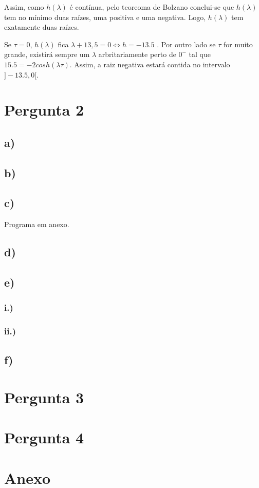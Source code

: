 \documentclass[a4paper, 12pt]{article}
\begin{document}
	\par
	Assim, como $h(\lambda)$ é contínua, pelo teoreoma de Bolzano conclui-se que $h(\lambda)$ tem no mínimo duas raízes, uma positiva e uma negativa. Logo, $h(\lambda)$ tem exatamente duas raízes.
	\par
	Se $\tau = 0$, $h(\lambda)$ fica $\lambda + 13,5 = 0 \Leftrightarrow h = -13.5$ . Por outro lado se $\tau$ for muito grande, existirá sempre um $\lambda$ arbritariamente perto de $0^-$ tal que $15.5 = -2cosh(\lambda\tau)$. Assim, a raiz negativa estará contida no intervalo $]-13.5, 0[$.

\section{Pergunta 2}
\subsection*{a)}
\subsection*{b)}
\subsection*{c)}
	Programa em anexo.
\subsection*{d)}
\subsection*{e)}
\subsubsection*{i.)}
\subsubsection*{ii.)}
\subsection*{f)}

\section{Pergunta 3}

\section{Pergunta 4}

\section{Anexo}
\end{document}
